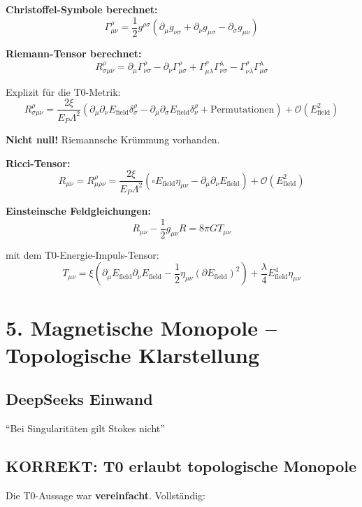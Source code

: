 	\textbf{Christoffel-Symbole berechnet:}
	\[
	\Gamma^\rho_{\mu\nu} = \frac{1}{2} g^{\rho\sigma} (\partial_\mu g_{\nu\sigma} + \partial_\nu g_{\mu\sigma} - \partial_\sigma g_{\mu\nu})
	\]
	
	\textbf{Riemann-Tensor berechnet:}
	\[
	R^\rho_{\sigma\mu\nu} = \partial_\mu \Gamma^\rho_{\nu\sigma} - \partial_\nu \Gamma^\rho_{\mu\sigma} + \Gamma^\rho_{\mu\lambda} \Gamma^\lambda_{\nu\sigma} - \Gamma^\rho_{\nu\lambda} \Gamma^\lambda_{\mu\sigma}
	\]
	
	Explizit für die T0-Metrik:
	\[
	R^\rho_{\sigma\mu\nu} = \frac{2\xi}{E_P \Lambda^2} \left(\partial_\mu \partial_\nu E_{\text{field}} \delta^\rho_\sigma - \partial_\mu \partial_\sigma E_{\text{field}} \delta^\rho_\nu + \text{Permutationen}\right) + \mathcal{O}(E_{\text{field}}^2)
	\]
	
	\textbf{Nicht null!} \checkmark Riemannsche Krümmung vorhanden.
	
	\textbf{Ricci-Tensor:}
	\[
	R_{\mu\nu} = R^\rho_{\mu\rho\nu} = \frac{2\xi}{E_P \Lambda^2} (\square E_{\text{field}} \eta_{\mu\nu} - \partial_\mu \partial_\nu E_{\text{field}}) + \mathcal{O}(E_{\text{field}}^2)
	\]
	
	\textbf{Einsteinsche Feldgleichungen:}
	\[
	R_{\mu\nu} - \frac{1}{2} g_{\mu\nu} R = 8\pi G T_{\mu\nu}
	\]
	
	mit dem T0-Energie-Impuls-Tensor:
	\[
	T_{\mu\nu} = \xi (\partial_\mu E_{\text{field}} \partial_\nu E_{\text{field}} - \frac{1}{2} \eta_{\mu\nu} (\partial E_{\text{field}})^2) + \frac{\lambda}{4} E_{\text{field}}^4 \eta_{\mu\nu}
	\]
	
	\section*{5. Magnetische Monopole -- Topologische Klarstellung}
	
	\subsection*{DeepSeeks Einwand}
	``Bei Singularitäten gilt Stokes nicht''
	
	\subsection*{\textbf{KORREKT: T0 erlaubt topologische Monopole}}
	
	Die T0-Aussage war \textbf{vereinfacht}. Vollständig:
	
